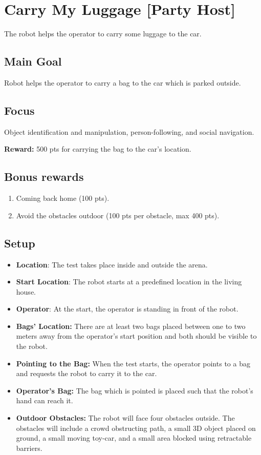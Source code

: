 \section{Carry My Luggage [Party Host]}
The robot helps the operator to carry some luggage to the car.

\subsection{Main Goal}
Robot helps the operator to carry a bag to the car which is parked outside.

\subsection{Focus}
Object identification and manipulation, person-following, and social navigation.

\noindent\textbf{Reward:} 500 pts for carrying the bag to the car's location.

\subsection{Bonus rewards}
\begin{enumerate}[nosep]
	\item Coming back home (100 pts).
	\item Avoid the obstacles outdoor (100 pts per obstacle, max 400 pts).
\end{enumerate}


\subsection{Setup}
\begin{itemize}
	\item \textbf{Location}: The test takes place inside and outside the arena.

	\item \textbf{Start Location}: The robot starts at a predefined location in the living house.

	\item \textbf{Operator}: At the start, the operator is standing in front of the robot.
	
	\item \textbf{Bags' Location:} There are at least two bags placed between one to two meters away from the operator's start position and both should be visible to the robot.
	
	\item \textbf{Pointing to the Bag:} When the test starts, the operator points to a bag and requests the robot to carry it to the car.
	
	\item \textbf{Operator's Bag:} The bag which is pointed is placed such that the robot's hand can reach it.
	
	\item \textbf{Outdoor Obstacles:} The robot will face four obstacles outside. The obstacles will include a crowd obstructing path, a small 3D object placed on ground, a small moving toy-car, and a small area blocked using retractable barriers.
\end{itemize}

